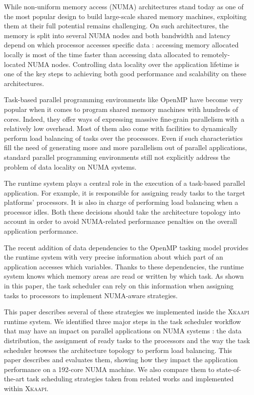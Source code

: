 \documentclass{Styles/llncs}
\newcommand{\kaapi}{\textsc{\mbox{Xkaapi}}\xspace}
\begin{document}
While non-uniform memory access (NUMA) architectures stand today as one of the most popular design to build large-scale shared memory machines, exploiting them at their full potential remains challenging.
On such architectures, the memory is split into several NUMA nodes and
both bandwidth and latency depend on which processor accesses specific data :
accessing memory allocated locally is most of the time faster than accessing data allocated to remotely-located NUMA nodes.
Controlling data locality over the application lifetime is one of the key steps to
achieving both good performance and scalability on these architectures.

Task-based parallel programming environments like OpenMP have become very popular when it comes to program shared memory machines with hundreds of cores. Indeed, they offer ways of expressing massive fine-grain parallelism with a relatively low overhead. Most of them also come with facilities to dynamically perform load balancing of tasks over the processors. Even if such characteristics fill the need of generating more and more parallelism out of parallel applications, standard parallel programming environments still not explicitly address the problem of data locality on NUMA systems.

The runtime system plays a central role in the execution of a task-based parallel application.
For example, it is responsible for assigning ready tasks to the target platforms' processors. 
It is also in charge of performing load balancing when a processor idles.
Both these decisions should take the architecture topology into account in order to avoid NUMA-related performance penalties on the overall application performance.

The recent addition of data dependencies to the OpenMP tasking model provides the
runtime system with very precise information about which part of an application accesses which variables. 
Thanks to these dependencies, the runtime system knows which memory areas are read or written by which task. As shown in this paper, the task scheduler can rely on this information when assigning tasks to processors to implement NUMA-aware strategies.

This paper describes several of these strategies we implemented inside the \kaapi runtime system.
We identified three major steps in the task scheduler workflow that may have an impact on parallel applications on NUMA systems : the data distribution, the assignment of ready tasks to the processors and the way the task scheduler browses the architecture topology to perform load balancing.
This paper describes and evaluates them, showing how they impact the application performance on a 192-core NUMA machine.
We also compare them to state-of-the-art task scheduling strategies taken from related works and implemented within \kaapi.
\end{document}
